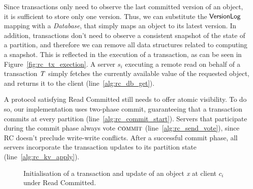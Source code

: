 Since transactions only need to observe the last committed version of an object, it is sufficient to store only one version. Thus, we can substitute the $\mathsf{VersionLog}$ mapping with a \emph{Database}, that simply maps an object to its latest version. In addition, transactions don't need to observe a consistent snapshot of the state of a partition, and therefore we can remove all data structures related to computing a snapshot. This is reflected in the execution of a transaction, as can be seen in Figure~\ref{fig:rc_tx_exection}. A server $s_i$ executing a remote read on behalf of a transaction $\mathit{T}$ simply fetches the currently available value of the requested object, and returns it to the client (line~\ref{alg:rc_db_get}).

A protocol satisfying Read Committed still needs to offer atomic visibility. To do so, our implementation uses two-phase commit, guaranteeing that a transaction commits at every partition (line~\ref{alg:rc_commit_start}). Servers that participate during the commit phase always vote $\text{\sc commit}$ (line~\ref{alg:rc_send_vote}), since RC doesn't preclude write-write conflicts. After a successful commit phase, all servers incorporate the transaction updates to its partition state (line~\ref{alg:rc_kv_apply}).

\begin{figure}[h]
\begin{algorithm}[H]
  \setcounter{AlgoLine}{0}

  \smallskip

\end{algorithm}
\caption{Initialisation of a transaction and update of an object \emph{x} at client $c_i$ under Read Committed.}
\end{figure}

